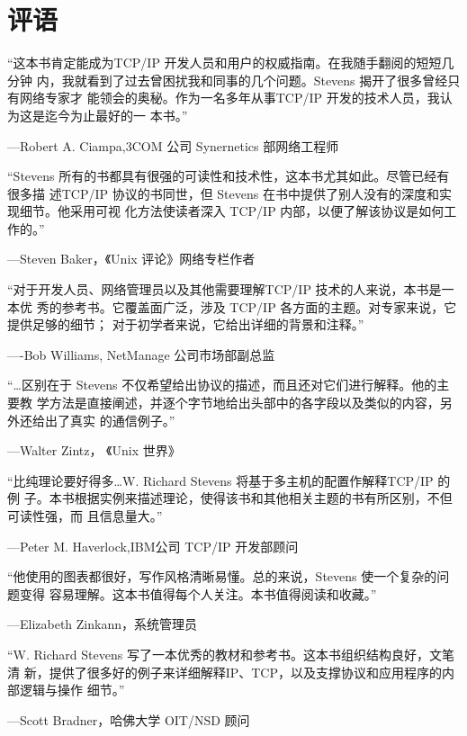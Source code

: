 

\chapter*{评语}
“这本书肯定能成为TCP/IP 开发人员和用户的权威指南。在我随手翻阅的短短几分钟
内，我就看到了过去曾困扰我和同事的几个问题。Stevens 揭开了很多曾经只有网络专家才
能领会的奥秘。作为一名多年从事TCP/IP 开发的技术人员，我认为这是迄今为止最好的一
本书。”
\begin{flushright}
  —Robert A. Ciampa,3COM 公司 Synernetics 部网络工程师
\end{flushright}

“Stevens 所有的书都具有很强的可读性和技术性，这本书尤其如此。尽管已经有很多描
述TCP/IP 协议的书同世，但 Stevens 在书中提供了别人没有的深度和实现细节。他采用可视
化方法使读者深入 TCP/IP 内部，以便了解该协议是如何工作的。”
\begin{flushright}
  —Steven Baker，《Unix 评论》网络专栏作者
\end{flushright}

“对于开发人员、网络管理员以及其他需要理解TCP/IP 技术的人来说，本书是一本优
秀的参考书。它覆盖面广泛，涉及 TCP/IP 各方面的主题。对专家来说，它提供足够的细节；
对于初学者来说，它给出详细的背景和注释。”
\begin{flushright}
  —-Bob Williams, NetManage 公司市场部副总监
\end{flushright}

“\dots 区别在于 Stevens 不仅希望给出协议的描述，而且还对它们进行解释。他的主要教
学方法是直接阐述，并逐个字节地给出头部中的各字段以及类似的内容，另外还给出了真实
的通信例子。”
\begin{flushright}
  —Walter Zintz， 《Unix 世界》
\end{flushright}

“比纯理论要好得多\dots W. Richard Stevens 将基于多主机的配置作解释TCP/IP 的例
子。本书根据实例来描述理论，使得该书和其他相关主题的书有所区别，不但可读性强，而
且信息量大。”
\begin{flushright}
  —Peter M. Haverlock,IBM公司 TCP/IP 开发部顾问
\end{flushright}

“他使用的图表都很好，写作风格清晰易懂。总的来说，Stevens 使一个复杂的问题变得
容易理解。这本书值得每个人关注。本书值得阅读和收藏。”
\begin{flushright}
  —Elizabeth Zinkann，系统管理员
\end{flushright}

“W. Richard Stevens 写了一本优秀的教材和参考书。这本书组织结构良好，文笔清
新，提供了很多好的例子来详细解释IP、TCP，以及支撑协议和应用程序的内部逻辑与操作
细节。”
\begin{flushright}
  —Scott Bradner，哈佛大学 OIT/NSD 顾问
\end{flushright}
